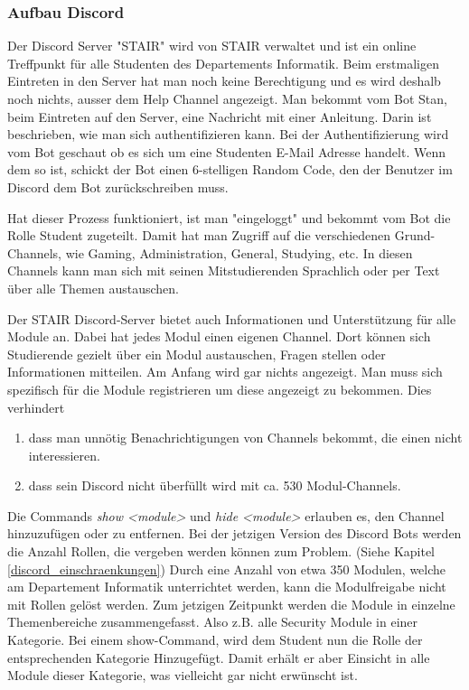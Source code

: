 \documentclass[a4paper, table]{article}
\begin{document}
\subsubsection{Aufbau Discord}
Der Discord Server "STAIR" wird von STAIR verwaltet und ist ein online Treffpunkt f\"ur alle Studenten des Departements Informatik.
Beim erstmaligen Eintreten in den Server hat man noch keine Berechtigung und es wird deshalb noch nichts, ausser dem Help Channel
angezeigt. Man bekommt vom Bot Stan, beim Eintreten auf den Server, eine Nachricht mit einer Anleitung. Darin ist beschrieben, wie
man sich authentifizieren kann. Bei der Authentifizierung wird vom Bot geschaut ob es sich um eine Studenten E-Mail Adresse handelt.
Wenn dem so ist, schickt der Bot einen 6-stelligen Random Code, den der Benutzer im Discord dem Bot zur\"uckschreiben muss.

Hat dieser Prozess funktioniert, ist man "eingeloggt" und bekommt vom Bot die Rolle Student zugeteilt. Damit hat man Zugriff auf
die verschiedenen Grund-Channels, wie Gaming, Administration, General, Studying, etc.
In diesen Channels kann man sich mit seinen Mitstudierenden Sprachlich oder per Text \"uber alle Themen austauschen.
\newline

Der STAIR Discord-Server bietet auch Informationen und Unterst\"utzung f\"ur alle Module an. Dabei hat jedes Modul einen eigenen Channel.
Dort k\"onnen sich Studierende gezielt \"uber ein Modul austauschen, Fragen stellen oder Informationen mitteilen.
Am Anfang wird gar nichts angezeigt. Man muss sich spezifisch f\"ur die Module registrieren um diese angezeigt zu bekommen. Dies verhindert

\begin{enumerate}
    \item dass man unn\"otig Benachrichtigungen von Channels bekommt, die einen nicht interessieren.
    \item dass sein Discord nicht \"uberf\"ullt wird mit ca. 530 Modul-Channels.
\end{enumerate}

Die Commands \textit{show <module>} und \textit{hide <module>} erlauben es, den Channel hinzuzuf\"ugen oder zu entfernen.
Bei der jetzigen Version des Discord Bots werden die Anzahl Rollen, die vergeben werden können zum Problem.
(Siehe Kapitel \ref{discord_einschraenkungen})
Durch eine Anzahl von etwa 350 Modulen, welche am Departement Informatik unterrichtet werden, 
kann die Modulfreigabe nicht mit Rollen gelöst werden.
Zum jetzigen Zeitpunkt werden die Module in einzelne Themenbereiche zusammengefasst.
Also \gls{z.B.} alle Security Module in einer Kategorie.
Bei einem show-Command, wird dem Student nun die Rolle der entsprechenden Kategorie Hinzugefügt.
Damit erhält er aber Einsicht in alle Module dieser Kategorie, was vielleicht gar nicht erwünscht ist.
\newline
\end{document}
